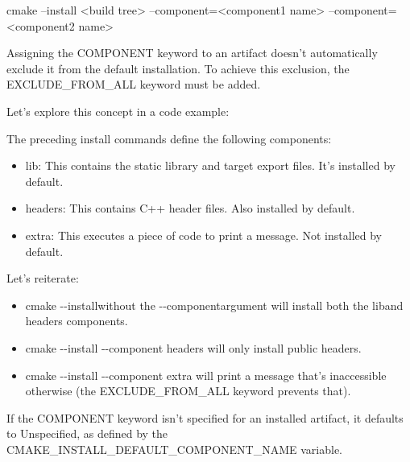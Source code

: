 \begin{shell}
cmake --install <build tree>
      --component=<component1 name> --component=<component2 name>
\end{shell}

Assigning the COMPONENT keyword to an artifact doesn’t automatically exclude it from the default installation. To achieve this exclusion, the EXCLUDE\_FROM\_ALL keyword must be added.

Let’s explore this concept in a code example:



The preceding install commands define the following components:

\begin{itemize}
\item
lib: This contains the static library and target export files. It’s installed by default.

\item
headers: This contains C++ header files. Also installed by default.

\item
extra: This executes a piece of code to print a message. Not installed by default.
\end{itemize}

Let’s reiterate:

\begin{itemize}
\item
cmake -{}-installwithout the -{}-componentargument will install both the liband headers components.

\item
cmake -{}-install -{}-component headers will only install public headers.

\item
cmake -{}-install -{}-component extra will print a message that’s inaccessible otherwise (the EXCLUDE\_FROM\_ALL keyword prevents that).
\end{itemize}

If the COMPONENT keyword isn’t specified for an installed artifact, it defaults to Unspecified, as defined by the CMAKE\_INSTALL\_DEFAULT\_COMPONENT\_NAME variable.

